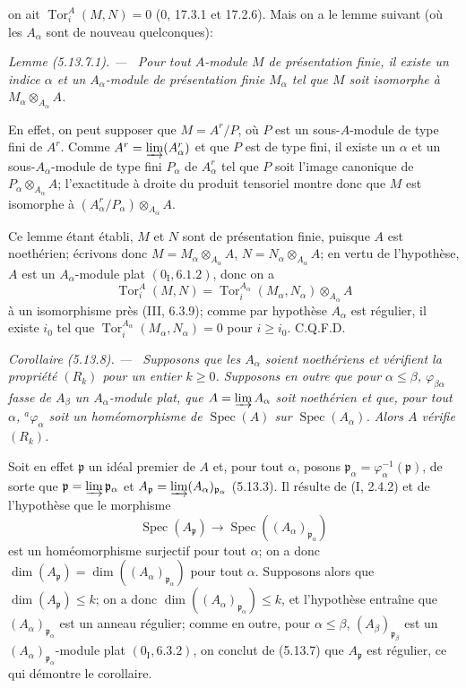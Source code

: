 \documentclass[10pt,oneside]{book}
\newcommand{\oldpage}[2][]{%
  \setcounter{footnote}{0}%
  \marginpar{\scriptsize\textbf{#1}~|~#2}\ignorespaces}
\newenvironment{corollary}[1][]{%
  \par\medskip\noindent\itshape Corollaire (#1). ---\ }{\par}
\newenvironment{lemma}[1][]{%
  \par\medskip\noindent\itshape Lemme (#1). ---\ }{\par}
\begin{document}
\oldpage[IV-2]{134}

on ait $\operatorname{Tor}^A_i(M,N)=0$ (0, 17.3.1 et 17.2.6). Mais on a le
lemme suivant (où les $A_\alpha$ sont de nouveau quelconques):

\begin{lemma}[5.13.7.1]
\label{IV.2.s5.13.7.1-fr}
Pour tout $A$-module $M$ de présentation finie, il existe un indice $\alpha$
et un $A_\alpha$-module de présentation finie $M_\alpha$ tel que $M$ soit
isomorphe à $M_\alpha\otimes_{A_\alpha}A$.
\end{lemma}

En effet, on peut supposer que $M=A^r/P$, où $P$ est un sous-$A$-module de
type fini de $A^r$. Comme $A^r=\varinjlim(A_\alpha^r)$ et que $P$ est de type
fini, il existe un $\alpha$ et un sous-$A_\alpha$-module de type fini
$P_\alpha$ de $A_\alpha^r$ tel que $P$ soit l'image canonique de
$P_\alpha\otimes_{A_\alpha}A$; l'exactitude à droite du produit tensoriel
montre donc que $M$ est isomorphe à
$(A_\alpha^r/P_\alpha)\otimes_{A_\alpha}A$.

Ce lemme étant établi, $M$ et $N$ sont de présentation finie, puisque $A$ est
noethérien; écrivons donc
$M=M_\alpha\otimes_{A_\alpha}A$,
$N=N_\alpha\otimes_{A_\alpha}A$; en vertu de l'hypothèse, $A$ est un
$A_\alpha$-module plat $(0_{\mathrm I}, 6.1.2)$, donc on a
\[
\operatorname{Tor}^A_i(M,N)
=\operatorname{Tor}^{A_\alpha}_i(M_\alpha,N_\alpha)
 \otimes_{A_\alpha}A
\]
à un isomorphisme près (III, 6.3.9); comme par hypothèse $A_\alpha$ est
régulier, il existe $i_0$ tel que
$\operatorname{Tor}^{A_\alpha}_i(M_\alpha,N_\alpha)=0$ pour $i\geq i_0$.
C.Q.F.D.

\begin{corollary}[5.13.8]
\label{IV.2.s5.13.8-fr}
Supposons que les $A_\alpha$ soient noethériens et vérifient la propriété
$(R_k)$ pour un entier $k\geq0$. Supposons en outre que pour
$\alpha\leq\beta$, $\varphi_{\beta\alpha}$ fasse de $A_\beta$ un
$A_\alpha$-module plat, que $A=\varinjlim A_\alpha$ soit noethérien et que,
pour tout $\alpha$, ${}^a\varphi_\alpha$ soit un homéomorphisme de
$\operatorname{Spec}(A)$ sur $\operatorname{Spec}(A_\alpha)$. Alors $A$
vérifie $(R_k)$.
\end{corollary}

Soit en effet $\mathfrak p$ un idéal premier de $A$ et, pour tout $\alpha$,
posons $\mathfrak p_\alpha=\varphi_\alpha^{-1}(\mathfrak p)$, de sorte que
$\mathfrak p=\varinjlim\mathfrak p_\alpha$ et
$A_{\mathfrak p}=\varinjlim(A_\alpha)_{\mathfrak p_\alpha}$ (5.13.3). Il
résulte de (I, 2.4.2) et de l'hypothèse que le morphisme
\[
\operatorname{Spec}(A_{\mathfrak p})
\longrightarrow\operatorname{Spec}((A_\alpha)_{\mathfrak p_\alpha})
\]
est un homéomorphisme surjectif pour tout $\alpha$; on a donc
$\dim(A_{\mathfrak p})=\dim((A_\alpha)_{\mathfrak p_\alpha})$ pour tout
$\alpha$. Supposons alors que $\dim(A_{\mathfrak p})\leq k$; on a donc
$\dim((A_\alpha)_{\mathfrak p_\alpha})\leq k$, et l'hypothèse entraîne que
$(A_\alpha)_{\mathfrak p_\alpha}$ est un anneau régulier; comme en outre, pour
$\alpha\leq\beta$, $(A_\beta)_{\mathfrak p_\beta}$ est un
$(A_\alpha)_{\mathfrak p_\alpha}$-module plat $(0_{\mathrm I}, 6.3.2)$, on
conclut de (5.13.7) que $A_{\mathfrak p}$ est régulier, ce qui démontre le
corollaire.
\end{document}
